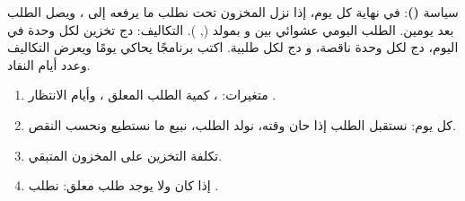 \begin{statement}
سياسة \textbf{()}: في نهاية كل يوم، إذا نزل المخزون تحت  نطلب ما يرفعه إلى ، ويصل الطلب بعد يومين. الطلب اليومي عشوائي بين  و بمولد  (, ). التكاليف:  دج تخزين لكل وحدة في اليوم،  دج لكل وحدة ناقصة، و دج لكل طلبية. اكتب برنامجًا يحاكي  يومًا ويعرض التكاليف وعدد أيام النفاد.
\end{statement}
\begin{stepsbox}\begin{enumerate}
\item متغيرات: ، كمية الطلب المعلق ، وأيام الانتظار .
\item كل يوم: نستقبل الطلب إذا حان وقته، نولد الطلب، نبيع ما نستطيع ونحسب النقص.
\item تكلفة التخزين على المخزون المتبقي.
\item إذا كان  ولا يوجد طلب معلق: نطلب .
\end{enumerate}\end{stepsbox}
